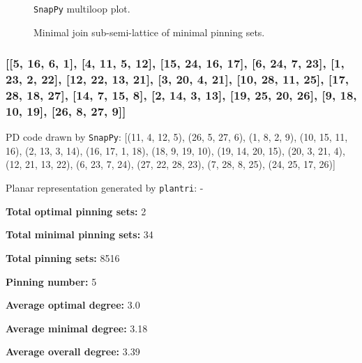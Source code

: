 \documentclass{article}%
\begin{document}
\begin{multicols}{2}
\begin{figure}[H]
\centering

\caption{\texttt{SnapPy} multiloop plot.}
\label{fig:tex/img/[[28, 7, 1, 8], [8, 13, 9, 14], [22, 27, 23, 28], [23, 6, 24, 7], [1, 12, 2, 13], [9, 20, 10, 21], [14, 21, 15, 22], [15, 26, 16, 27], [16, 5, 17, 6], [24, 17, 25, 18], [18, 11, 19, 12], [2, 19, 3, 20.svg}
\end{figure}
\columnbreak

\begin{figure}[H]
\centering
\scalebox{0.8}{}
\caption{Minimal join sub-semi-lattice of minimal pinning sets.}
\label{fig:tex/img/[[28, 7, 1, 8], [8, 13, 9, 14], [22, 27, 23, 28], [23, 6, 24, 7], [1, 12, 2, 13], [9, 20, 10, 21], [14, 21, 15, 22], [15, 26, 16, 27], [16, 5, 17, 6], [24, 17, 25, 18], [18, 11, 19, 12], [2, 19, 3, 20.pgf}
\end{figure}
\end{multicols}

\newpage

\subsubsection{[[5, 16, 6, 1], [4, 11, 5, 12], [15, 24, 16, 17], [6, 24, 7, 23], [1, 23, 2, 22], [12, 22, 13, 21], [3, 20, 4, 21], [10, 28, 11, 25], [17, 28, 18, 27], [14, 7, 15, 8], [2, 14, 3, 13], [19, 25, 20, 26], [9, 18, 10, 19], [26, 8, 27, 9]]}

{\small\noindent PD code drawn by \texttt{SnapPy}: [(11, 4, 12, 5), (26, 5, 27, 6), (1, 8, 2, 9), (10, 15, 11, 16), (2, 13, 3, 14), (16, 17, 1, 18), (18, 9, 19, 10), (19, 14, 20, 15), (20, 3, 21, 4), (12, 21, 13, 22), (6, 23, 7, 24), (27, 22, 28, 23), (7, 28, 8, 25), (24, 25, 17, 26)]}

{\small\noindent Planar representation generated by \texttt{plantri}: -}

\begin{multicols}{2}
{\normalsize \noindent\textbf{Total optimal pinning sets:} 2

\noindent\textbf{Total minimal pinning sets:} 34

\noindent\textbf{Total pinning sets:} 8516

\noindent\textbf{Pinning number:} 5

}
\columnbreak

{\normalsize \noindent\textbf{Average optimal degree:} 3.0

\noindent\textbf{Average minimal degree:} 3.18

\noindent\textbf{Average overall degree:} 3.39

}
\end{multicols}
\end{document}
